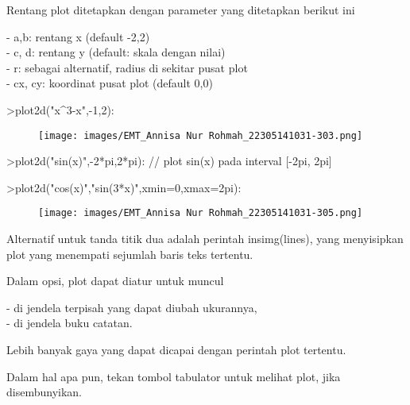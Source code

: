 \documentclass[a4paper,10pt]{article}
\begin{document}
\begin{eulernotebook}
\begin{eulercomment}
Rentang plot ditetapkan dengan parameter yang ditetapkan berikut ini

- a,b: rentang x (default -2,2)\\
- c, d: rentang y (default: skala dengan nilai)\\
- r: sebagai alternatif, radius di sekitar pusat plot\\
- cx, cy: koordinat pusat plot (default 0,0)
\end{eulercomment}
\begin{eulerprompt}
>plot2d("x^3-x",-1,2):
\end{eulerprompt}
\begin{figure}[h]
    \centering
    \texttt{[image: images/EMT\_Annisa Nur Rohmah\_22305141031-303.png]}
\end{figure}
\begin{eulerprompt}
>plot2d("sin(x)",-2*pi,2*pi): // plot sin(x) pada interval [-2pi, 2pi]
\end{eulerprompt}
\begin{eulerprompt}
>plot2d("cos(x)","sin(3*x)",xmin=0,xmax=2pi):
\end{eulerprompt}
\begin{figure}[h]
    \centering
    \texttt{[image: images/EMT\_Annisa Nur Rohmah\_22305141031-305.png]}
\end{figure}
\begin{eulercomment}
Alternatif untuk tanda titik dua adalah perintah insimg(lines), yang
menyisipkan plot yang menempati sejumlah baris teks tertentu.

Dalam opsi, plot dapat diatur untuk muncul

- di jendela terpisah yang dapat diubah ukurannya,\\
- di jendela buku catatan.

Lebih banyak gaya yang dapat dicapai dengan perintah plot tertentu.

Dalam hal apa pun, tekan tombol tabulator untuk melihat plot, jika
disembunyikan.


\end{eulercomment}
\end{eulernotebook}
\end{document}
